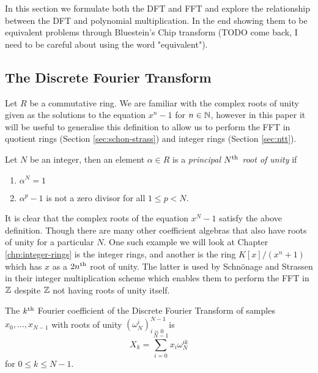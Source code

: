 In this section we formulate both the DFT and FFT and explore the relationship between the DFT and polynomial multiplication. In the end showing them to be equivalent problems through Bluestein's Chip transform (TODO come back, I need to be careful about using the word "equivalent").

\subsection{The Discrete Fourier Transform}

Let $R$ be a commutative ring. We are familiar with the complex roots of unity given as the solutions to the equation $x^n - 1$ for $n \in {\mathbb N}$, however in this paper it will be useful to generalise this definition to allow us to perform the FFT in quotient rings (Section \ref{sec:schon-strass}) and integer rings (Section \ref{sec:ntt}).

\begin{definition}
  Let $N$ be an integer, then an element $\alpha \in R$ is a \emph{principal $N^{\textrm{th}}$ root of unity} if
  \begin{enumerate}
    \item $\alpha^N = 1$
    \item $\alpha^p - 1$ is not a zero divisor for all $1 \leq p < N$.
  \end{enumerate}
\end{definition}

It is clear that the complex roots of the equation $x^N - 1$ satisfy the above definition. Though there are many other coefficient algebras that also have roots of unity for a particular $N$. One such example we will look at Chapter \ref{chp:integer-rings} is the integer rings, and another is the ring $K[x]/(x^n + 1)$ which has $x$ as a $2n^{\textrm{th}}$ root of unity. The latter is used by Schn\"{o}nage and Strassen in their integer multiplication scheme which enables them to perform the FFT in ${\mathbb Z}$ despite ${\mathbb Z}$ not having roots of unity itself.

\begin{definition}
    The $k^{\textrm{th}}$ Fourier coefficient of the Discrete Fourier Transform of samples $x_0, \ldots, x_{N-1}$ with roots of unity $(\omega_N^i)_{i=0}^{N-1}$ is
\[
    X_k = \sum^{N-1}_{i=0}x_i\omega_{N}^{ik}
\]
for $0 \leq k \leq N-1$.
\end{definition}

